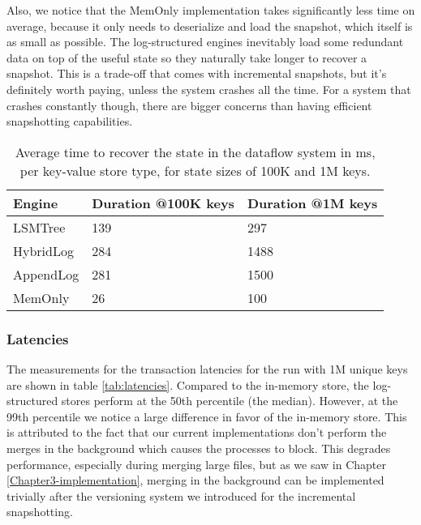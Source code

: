 Also, we notice that the MemOnly implementation takes significantly less time on average, because it only needs to deserialize and load the snapshot, which itself is as small as possible. The log-structured engines inevitably load some redundant data on top of the useful state so they naturally take longer to recover a snapshot. This is a trade-off that comes with incremental snapshots, but it's definitely worth paying, unless the system crashes all the time. For a system that crashes constantly though, there are bigger concerns than having efficient snapshotting capabilities.

\begin{table}[]
\centering
\begin{tabular}{@{}lll@{}}
\toprule
\textbf{Engine} & \textbf{Duration @100K keys} & \textbf{Duration @1M keys} \\ \midrule
LSMTree & 139 & 297 \\
HybridLog & 284 & 1488 \\
AppendLog & 281 & 1500 \\
MemOnly & 26 & 100 \\ \bottomrule
\end{tabular}
\caption{Average time to recover the state in the dataflow system in ms, per key-value store type, for state sizes of 100K and 1M keys.}
\label{tab:recoveries}
\end{table}

\subsubsection{Latencies}

The measurements for the transaction latencies for the run with 1M unique keys are shown in table \ref{tab:latencies}. Compared to the in-memory store, the log-structured stores perform at the 50th percentile (the median). However, at the 99th percentile we notice a large difference in favor of the in-memory store. This is attributed to the fact that our current implementations don't perform the merges in the background which causes the processes to block. This degrades performance, especially during merging large files, but as we saw in Chapter \ref{Chapter3-implementation}, merging in the background can be implemented trivially after the versioning system we introduced for the incremental snapshotting.

